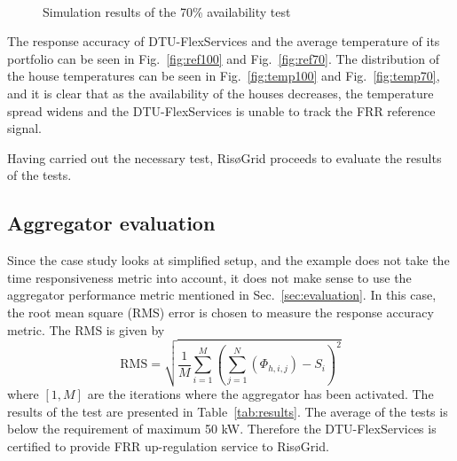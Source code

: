\begin{figure}[!t]
\centering
{}
\\
\caption{Simulation results of the 70\% availability test}
\label{fig:test70}
\end{figure}

The response accuracy of DTU-FlexServices and the average temperature of its portfolio can be seen in Fig.~\ref{fig:ref100} and Fig.~\ref{fig:ref70}. The distribution of the house temperatures can be seen in Fig.~\ref{fig:temp100} and Fig.~\ref{fig:temp70}, and it is clear that as the availability of the houses decreases, the temperature spread widens and the DTU-FlexServices is unable to track the FRR reference signal.

Having carried out the necessary test, RisøGrid proceeds to evaluate the results of the tests.

\subsection{Aggregator evaluation}
Since the case study looks at simplified setup, and the example does not take the time responsiveness metric into account, it does not make sense to use the aggregator performance metric mentioned in Sec.~\ref{sec:evaluation}. In this case, the root mean square (RMS) error is chosen to measure the response accuracy metric. The RMS is given by 
\begin{equation}
  \mbox{RMS} = \sqrt{\frac{1}{M}\sum_{i=1}^M\left(\sum_{j=1}^N\left(\Phi_{h,i,j}\right) - S_i\right)^2}
\end{equation}
where $\left[1,M\right]$ are the iterations where the aggregator has been activated. The results of the test are presented in Table~\ref{tab:results}. The average of the tests is below the requirement of maximum 50 kW. Therefore the DTU-FlexServices is certified to provide FRR up-regulation service to RisøGrid.

